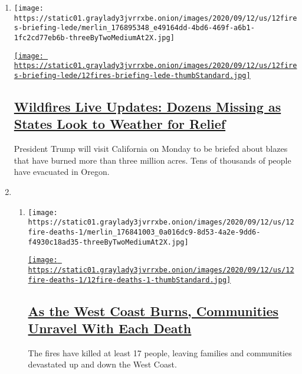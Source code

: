 \begin{enumerate}
\def\labelenumi{\arabic{enumi}.}
\item
  \texttt{[image: https://static01.graylady3jvrrxbe.onion/images/2020/09/12/us/12fires-briefing-lede/merlin\_176895348\_e49164dd-4bd6-469f-a6b1-1fc2cd77eb6b-threeByTwoMediumAt2X.jpg]}

  \href{/2020/09/12/us/wildfires-live-updates.html}{\texttt{[image: https://static01.graylady3jvrrxbe.onion/images/2020/09/12/us/12fires-briefing-lede/12fires-briefing-lede-thumbStandard.jpg]}}

  \hypertarget{wildfires-live-updates-dozens-missing-as-states-look-to-weather-for-relief}{%
  \subsection{\texorpdfstring{\href{/2020/09/12/us/wildfires-live-updates.html}{Wildfires
  Live Updates: Dozens Missing as States Look to Weather for
  Relief}}{Wildfires Live Updates: Dozens Missing as States Look to Weather for Relief}}\label{wildfires-live-updates-dozens-missing-as-states-look-to-weather-for-relief}}

  President Trump will visit California on Monday to be briefed about
  blazes that have burned more than three million acres. Tens of
  thousands of people have evacuated in Oregon.
\item
  \begin{enumerate}
  \def\labelenumii{\arabic{enumii}.}
  \item
    \texttt{[image: https://static01.graylady3jvrrxbe.onion/images/2020/09/12/us/12fire-deaths-1/merlin\_176841003\_0a016dc9-8d53-4a2e-9dd6-f4930c18ad35-threeByTwoMediumAt2X.jpg]}

    \href{/2020/09/12/us/wildfire-deaths.html}{\texttt{[image: https://static01.graylady3jvrrxbe.onion/images/2020/09/12/us/12fire-deaths-1/12fire-deaths-1-thumbStandard.jpg]}}

    \hypertarget{as-the-west-coast-burns-communities-unravel-with-each-death}{%
    \subsection{\texorpdfstring{\href{/2020/09/12/us/wildfire-deaths.html}{As
    the West Coast Burns, Communities Unravel With Each
    Death}}{As the West Coast Burns, Communities Unravel With Each Death}}\label{as-the-west-coast-burns-communities-unravel-with-each-death}}

    The fires have killed at least 17 people, leaving families and
    communities devastated up and down the West Coast.


\end{enumerate}
\end{enumerate}
